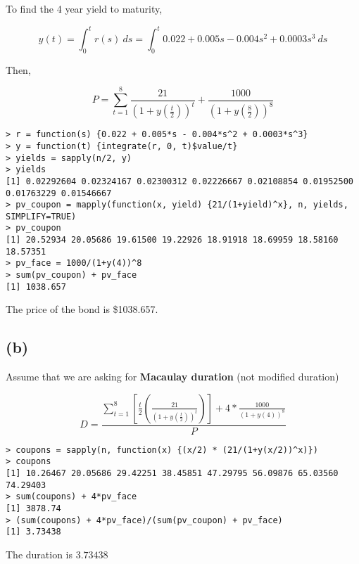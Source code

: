 \documentclass[11pt]{scrartcl}
\begin{document}
To find the 4 year yield to maturity,

\[y(t) = \int_0^t r(s) \: ds = \int_0^t 0.022 + 0.005s - 0.004s^2 + 0.0003s^3 \: ds\]

Then,

\[P = \sum_{t=1}^8 \frac{21}{\left(1+y\left(\frac{t}{2}\right)\right)^t} + \frac{1000}{\left(1+y\left(\frac{8}{2}\right)\right)^8}\]

\begin{lstlisting}
> r = function(s) {0.022 + 0.005*s - 0.004*s^2 + 0.0003*s^3}
> y = function(t) {integrate(r, 0, t)$value/t}
> yields = sapply(n/2, y)
> yields
[1] 0.02292604 0.02324167 0.02300312 0.02226667 0.02108854 0.01952500 0.01763229 0.01546667
> pv_coupon = mapply(function(x, yield) {21/(1+yield)^x}, n, yields, SIMPLIFY=TRUE)
> pv_coupon
[1] 20.52934 20.05686 19.61500 19.22926 18.91918 18.69959 18.58160 18.57351
> pv_face = 1000/(1+y(4))^8
> sum(pv_coupon) + pv_face
[1] 1038.657
\end{lstlisting}

The price of the bond is \$1038.657.

\subsection*{(b)}

Assume that we are asking for \textbf{Macaulay duration} (not modified duration)

\[D = \frac{\sum_{t=1}^8 \left[\frac{t}{2} \left(\frac{21}{\left(1+y\left(\frac{t}{2}\right)\right)^t} \right)\right] + 4 * \frac{1000}{(1+y(4))^8}}{P}\]

\begin{lstlisting}
> coupons = sapply(n, function(x) {(x/2) * (21/(1+y(x/2))^x)})
> coupons
[1] 10.26467 20.05686 29.42251 38.45851 47.29795 56.09876 65.03560 74.29403
> sum(coupons) + 4*pv_face
[1] 3878.74
> (sum(coupons) + 4*pv_face)/(sum(pv_coupon) + pv_face)
[1] 3.73438
\end{lstlisting}

The duration is $3.73438$
\end{document}
